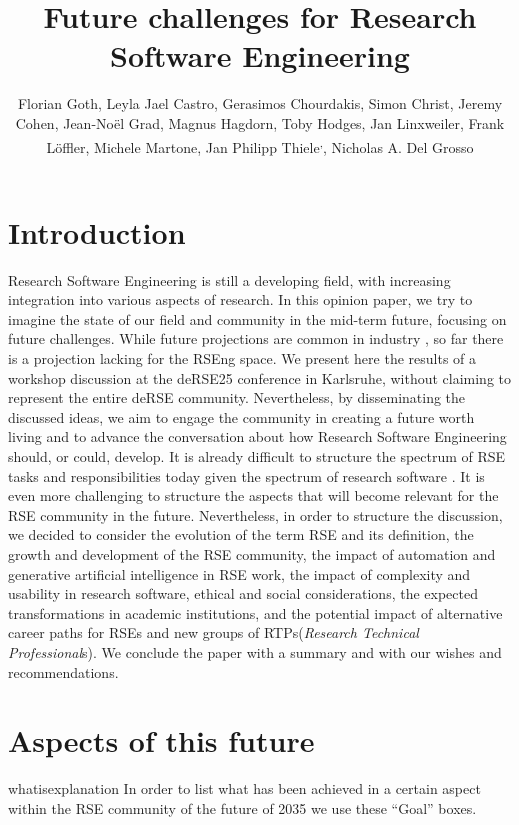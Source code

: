 \documentclass{eceasst}
\title{Future challenges for Research Software Engineering} %
\author{
Florian Goth\authorRef{1},
Leyla Jael Castro\authorRef{2},
Gerasimos Chourdakis\authorRef{3},
Simon Christ\authorRef{4},
Jeremy Cohen\authorRef{5},
Jean-Noël Grad\authorRef{6},
Magnus Hagdorn\authorRef{7},
Toby Hodges\authorRef{8},
Jan Linxweiler\authorRef{9},
Frank Löffler\authorRef{10},
Michele Martone\authorRef{11},
Jan Philipp Thiele\authorRef{9}\textsuperscript{,}\authorRef{12},
Nicholas A. Del Grosso\authorRef{13}
} %
\institute{%
\autlabel{1} Institut für theoretische Physik 1, University of Würzburg, 97074, Würzburg, Germany\par
\autlabel{2} ZB MED Information Centre for Life Sciences, Cologne, Germany\par
\autlabel{3} Institute for Parallel and Distributed Systems, University of Stuttgart, Stuttgart, Germany\par
\autlabel{4} Leibniz University Hannover, Department of Cell Biology and Biophysics, Computational Biology, Germany\par
\autlabel{5} Imperial College London, London, UK\par
\autlabel{6} Institute for Computational Physics, University of Stuttgart, Germany\par
\autlabel{7} Geschäftsbereich IT, Charité Universitätsmedizin Berlin, Germany\par
\autlabel{8} The Carpentries, USA\par
\autlabel{9} Technische Universität Braunschweig, Germany\par
\autlabel{10} Michael Stifel Center Jena {\&} Friedrich Schiller University Jena, Germany\par
\autlabel{11} Leibniz Supercomputing Centre, Garching, Germany\par
\autlabel{12} Weierstrass Institute, Berlin, Germany;
              Leibniz University Hannover, Institute of Applied Mathematics, Scientific Computing, Hannover, Germany\par
\autlabel{13} Institute for Experimental Epileptology and Cognition Research, Uniklinikum Bonn, Germany
}
\begin{document}
\maketitle

\section{Introduction}

Research Software Engineering is still a developing field,
with increasing integration into various aspects of research.
In this opinion paper, we try to imagine the state of our field
and community in the mid-term future, focusing on future challenges.
While future projections are common in industry \cite{gartner}, so far there is a projection lacking for the RSEng space.
We present here the results of a workshop discussion at the
deRSE25 conference in Karlsruhe\cite{Goth2025EndRSEng}, without
claiming to represent the entire deRSE community.
Nevertheless, by disseminating the discussed ideas,
we aim to engage the community in creating a future worth living
and to advance the conversation about how Research Software Engineering should, or could, develop.
It is already difficult to structure the spectrum of RSE tasks and responsibilities today given the spectrum of research software \cite{hasselbring2024}.
It is even more challenging to structure the aspects that will become relevant for the RSE community in the future.
Nevertheless, in order to structure the discussion, we decided to consider
the evolution of the term RSE and its definition,
the growth and development of the RSE community,
the impact of automation and generative artificial intelligence in RSE work,
the impact of complexity and usability in research software,
ethical and social considerations,
the expected transformations in academic institutions,
and the potential impact of alternative career paths for RSEs and new groups of RTPs(\emph{Research Technical Professional}s).
%
We conclude the paper with a summary and with our wishes and recommendations.

\section{Aspects of this future}
\begin{whatis}{}{whatisexplanation}
In order to list what has been achieved in a certain aspect within the RSE community of the future of 2035 we use these ``Goal'' boxes.
\end{whatis}
\end{document}

